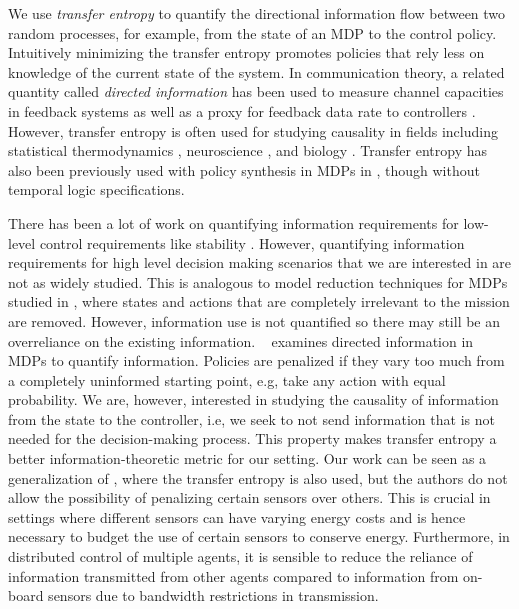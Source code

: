 We use \emph{transfer entropy} \cite{schreiber2000} to quantify the directional information flow between two random processes, for example, from the state of an MDP to the control policy. Intuitively minimizing the transfer entropy promotes policies that rely less on knowledge of the current state of the system. In communication theory, a related quantity called \emph{directed information} has been used to measure channel capacities in feedback systems \cite{massey1990causality,tatikonda2009capacity} as well as a proxy for feedback data rate to controllers \cite{silva2011achievable}. However, transfer entropy is often used for studying causality in fields including statistical thermodynamics \cite{parrondo2015thermodynamics}, neuroscience \cite{vicente2011transfer}, and biology \cite{tung2007inferring}. Transfer entropy has also been previously used with policy synthesis in MDPs in \cite{takashi17}, though without temporal logic specifications. 

There has been a lot of work on quantifying information requirements for low-level control requirements like stability \cite{Nair07}. However, quantifying information requirements for high level decision making scenarios that we are interested in are not as widely studied. This is analogous to model reduction techniques for MDPs studied in \cite{Bharadwaj17,brazdil2014verification,ciesinski2008reduction}, where states and actions that are completely irrelevant to the mission are removed. However, information use is not quantified so there may still be an overreliance on the existing information. ~\cite{Tishby2011} examines directed information in MDPs to quantify information. Policies are penalized if they vary too much from a completely uninformed starting point, e.g, take any action with equal probability. We are, however, interested in studying the causality of information from the state to the controller, i.e, we seek to not send information that is not needed for the decision-making process. This property makes transfer entropy a better information-theoretic metric for our setting. Our work can be seen as a generalization of \cite{takashi17}, where the transfer entropy is also used, but the authors do not allow the possibility of penalizing certain sensors over others. This is crucial in settings where different sensors can have varying energy costs and is hence necessary to budget the use of certain sensors to conserve energy. Furthermore, in distributed control of multiple agents, it is sensible to reduce the reliance of information transmitted from other agents compared to information from on-board sensors due to bandwidth restrictions in transmission.

